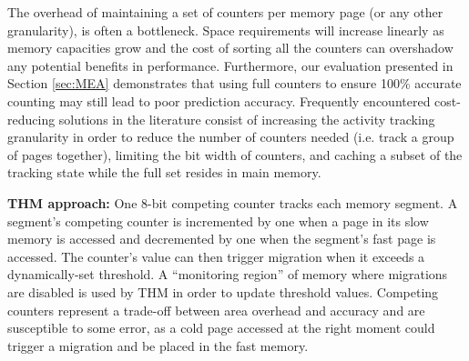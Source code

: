 
The overhead of maintaining a set of counters per memory page (or any other granularity), is often a bottleneck. Space requirements will increase linearly as memory capacities grow and the cost of sorting all the counters can overshadow any potential benefits in performance. Furthermore, our evaluation presented in Section \ref{sec:MEA} demonstrates that using full counters to ensure 100\% accurate counting may still lead to poor prediction accuracy. Frequently encountered cost-reducing solutions in the literature consist of increasing the activity tracking granularity in order to reduce the number of counters needed (i.e. track a group of pages together), limiting the bit width of counters, and caching a subset of the tracking state while the full set resides in main memory. 




	\textbf{THM approach:} One 8-bit competing counter tracks each memory segment. A segment's competing counter is incremented by one when a page in its slow memory is accessed and decremented by one when the segment's fast page is accessed. The counter's value can then trigger migration when it exceeds a dynamically-set threshold. A ``monitoring region'' of memory where migrations are disabled is used by THM in order to update threshold values. Competing counters represent a trade-off between area overhead and accuracy and are susceptible to some error, as a cold page accessed at the right moment could trigger a migration and be placed in the fast memory.

